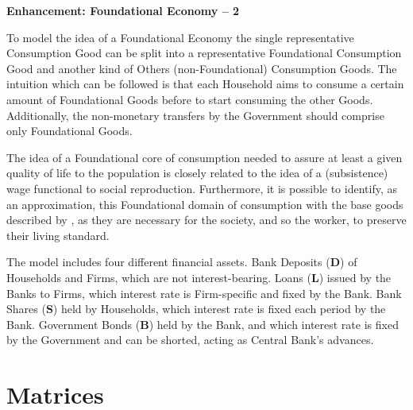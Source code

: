 \documentclass[a4paper, headings=standardclasses]{scrartcl}
\newenvironment{enh}[1][]{\begin{framed}\noindent\textbf{Enhancement: #1}\par}{\end{framed}}
\begin{document}
\begin{enh}[Foundational Economy -- 2]
    To model the idea of a Foundational Economy the single representative Consumption Good can be split into a representative Foundational Consumption Good and another kind of Others (non-Foundational) Consumption Goods.
    The intuition which can be followed is that each Household aims to consume a certain amount of Foundational Goods before to start consuming the other Goods. Additionally, the non-monetary transfers by the Government should comprise only Foundational Goods.

    The idea of a Foundational core of consumption needed to assure at least a given quality of life to the population is closely related to the idea of a (subsistence) wage functional to social reproduction.
    Furthermore, it is possible to identify, as an approximation, this Foundational domain of consumption with the base goods described by \textcite{sraffa1960}, as they are necessary for the society, and so the worker, to preserve their living standard.
\end{enh}

The model includes four different financial assets.
Bank Deposits ($\mathbf{D}$) of Households and Firms, which are not interest-bearing.
Loans ($\mathbf{L}$) issued by the Banks to Firms, which interest rate is Firm-specific and fixed by the Bank.
Bank Shares ($\mathbf{S}$) held by Households, which interest rate is fixed each period by the Bank.
Government Bonds ($\mathbf{B}$) held by the Bank, and which interest rate is fixed by the Government and can be shorted, acting as Central Bank's advances.

\section{Matrices}
\end{document}
